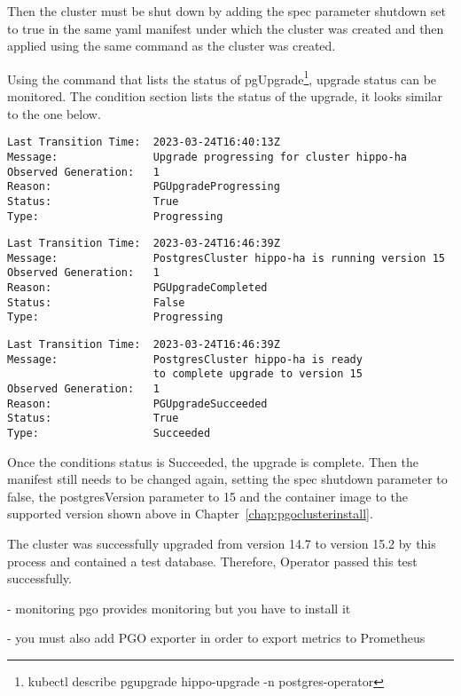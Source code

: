 Then the cluster must be shut down by adding the spec parameter shutdown set to true in the same yaml manifest under which the cluster was created and then applied using the same command as the cluster was created.

Using the command that lists the status of pgUpgrade\footnote{kubectl describe pgupgrade hippo-upgrade -n postgres-operator}, upgrade status can be monitored. The condition section lists the status of the upgrade, it looks similar to the one below.

\begin{verbatim}
Last Transition Time:  2023-03-24T16:40:13Z
Message:               Upgrade progressing for cluster hippo-ha
Observed Generation:   1
Reason:                PGUpgradeProgressing
Status:                True
Type:                  Progressing
\end{verbatim}
\begin{verbatim}
Last Transition Time:  2023-03-24T16:46:39Z
Message:               PostgresCluster hippo-ha is running version 15
Observed Generation:   1
Reason:                PGUpgradeCompleted
Status:                False
Type:                  Progressing
\end{verbatim}
\begin{verbatim}
Last Transition Time:  2023-03-24T16:46:39Z
Message:               PostgresCluster hippo-ha is ready 
                       to complete upgrade to version 15
Observed Generation:   1
Reason:                PGUpgradeSucceeded
Status:                True
Type:                  Succeeded
\end{verbatim}

Once the conditions status is Succeeded, the upgrade is complete. Then the manifest still needs to be changed again, setting the spec shutdown parameter to false, the postgresVersion parameter to 15 and the container image to the supported version shown above in Chapter~\ref{chap:pgoclusterinstall}.

The cluster was successfully upgraded from version 14.7 to version 15.2 by this process and contained a test database. Therefore, Operator passed this test successfully.



- monitoring pgo provides monitoring but you have to install it

- you must also add PGO exporter in order to export metrics to Prometheus

